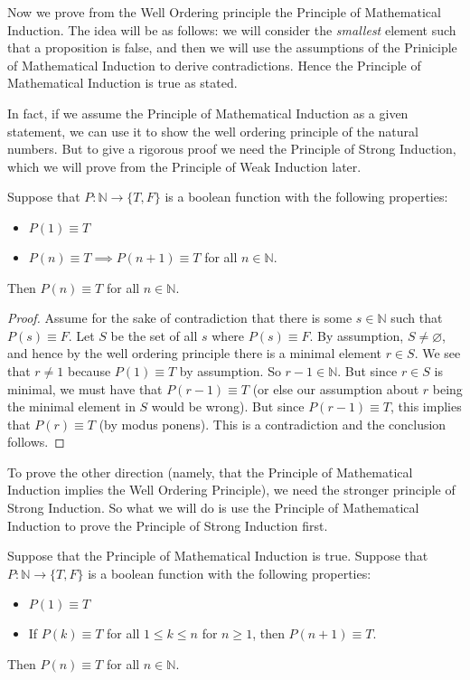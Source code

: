 Now we prove from the Well Ordering principle the Principle of Mathematical Induction. The idea will be as follows: we will consider the \textit{smallest} element such that a proposition is false, and then we will use the assumptions of the Priniciple of Mathematical Induction to derive contradictions. Hence the Principle of Mathematical Induction is true as stated.

In fact, if we assume the Principle of Mathematical Induction as a given statement, we can use it to show the well ordering principle of the natural numbers. But to give a rigorous proof we need the Principle of Strong Induction, which we will prove from the Principle of Weak Induction later.

\begin{theorem}
Suppose that $P: \mathbb{N} \to \{T, F\}$ is a boolean function with the following properties:
\begin{itemize}
	\item $P(1) \equiv T$
	\item $P(n) \equiv T \implies P(n + 1) \equiv T$ for all $n \in \mathbb{N}$.
\end{itemize}
Then $P(n) \equiv T$ for all $n \in \mathbb{N}$.
\end{theorem}

\begin{proof}
Assume for the sake of contradiction that there is some $s \in \mathbb{N}$ such that $P(s) \equiv F$. Let $S$ be the set of all $s$ where $P(s) \equiv F$. By assumption, $S \neq \varnothing$, and hence by the well ordering principle there is a minimal element $r \in S$. We see that $r \neq 1$ because $P(1) \equiv T$ by assumption. So $r - 1 \in \mathbb{N}$. But since $r \in S$ is minimal, we must have that $P(r - 1) \equiv T$ (or else our assumption about $r$ being the minimal element in $S$ would be wrong). But since $P(r - 1) \equiv T$, this implies that $P(r) \equiv T$ (by modus ponens). This is a contradiction and the conclusion follows.
\end{proof}

To prove the other direction (namely, that the Principle of Mathematical Induction implies the Well Ordering Principle), we need the stronger principle of Strong Induction. So what we will do is use the Principle of Mathematical Induction to prove the Principle of Strong Induction first.

\begin{theorem}
Suppose that the Principle of Mathematical Induction is true. Suppose that $P: \mathbb{N} \to \{T, F\}$ is a boolean function with the following properties:
\begin{itemize}
	\item $P(1) \equiv T$
	\item If $P(k) \equiv T$ for all $1 \leq k \leq n$ for $n \geq 1$, then $P(n + 1) \equiv T$.
\end{itemize}

Then $P(n) \equiv T$ for all $n \in \mathbb{N}$.
\end{theorem}

